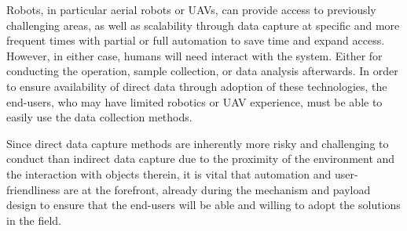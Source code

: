 


Robots, in particular aerial robots or UAVs, can provide access to previously challenging areas, as well as scalability through data capture at specific and more frequent times with partial or full automation to save time and expand access. However, in either case, humans will need interact with the system. Either for conducting the operation, sample collection, or data analysis afterwards. In order to ensure availability of direct data through adoption of these technologies, the end-users, who may have limited robotics or UAV experience, must be able to easily use the data collection methods.


Since direct data capture methods are inherently more risky and challenging to conduct than indirect data capture due to the proximity of the environment and the interaction with objects therein, it is vital that automation and user-friendliness are at the forefront, already during the mechanism and payload design to ensure that the end-users will be able and willing to adopt the solutions in the field.

